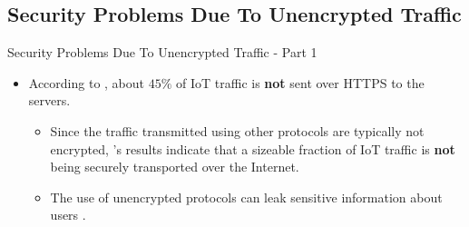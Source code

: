 \documentclass[13.5pt]{beamer}
\begin{document}
\subsection{Security Problems Due To Unencrypted Traffic}
\begin{frame}{Security Problems Due To Unencrypted Traffic - Part 1}

\begin{itemize}
\justifying

\item According to \citet{ITPAReport}, about $45\%$ of IoT traffic is \textbf{not} sent over HTTPS to the servers. 

\begin{itemize}
\justifying
\item Since the traffic transmitted using other protocols are typically not encrypted, \citet{ITPAReport}'s results indicate that a sizeable fraction of IoT traffic is \textbf{not} being securely transported over the Internet.
\end{itemize}

\begin{itemize}
\item The use of unencrypted protocols can leak sensitive information about users \cite{mazhar2020characterizing}.
\end{itemize}

\end{itemize}


\end{frame} 
\end{document}
